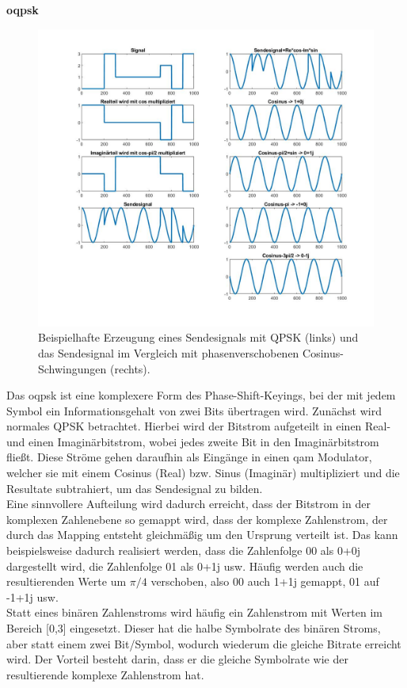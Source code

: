 \textbf{\ac{oqpsk}}\\
\begin{figure}
	\centering
	\includegraphics[width=\textwidth]{Grafiken-Alex/qpsk.jpg}
	\caption{Beispielhafte Erzeugung eines Sendesignals mit QPSK (links) und das Sendesignal im Vergleich mit phasenverschobenen Cosinus-Schwingungen (rechts).}
	\label{qpsk}
\end{figure}
Das \acf{oqpsk} ist eine komplexere Form des Phase-Shift-Keyings, bei der mit jedem Symbol ein Informationsgehalt von zwei Bits übertragen wird. Zunächst wird normales QPSK betrachtet. Hierbei wird der Bitstrom aufgeteilt in einen Real- und einen Imaginärbitstrom, wobei jedes zweite Bit in den Imaginärbitstrom fließt. Diese Ströme gehen daraufhin als Eingänge in einen \ac{qam} Modulator, welcher sie mit einem Cosinus (Real) bzw. Sinus (Imaginär) multipliziert und die Resultate subtrahiert, um das Sendesignal zu bilden.\\
Eine sinnvollere Aufteilung wird dadurch erreicht, dass der Bitstrom in der komplexen Zahlenebene so gemappt wird, dass der komplexe Zahlenstrom, der durch das Mapping entsteht gleichmäßig um den Ursprung verteilt ist. Das kann beispielsweise dadurch realisiert werden, dass die Zahlenfolge 00 als 0+0j dargestellt wird, die Zahlenfolge 01 als 0+1j usw. Häufig werden auch die resultierenden Werte um $\pi/4$ verschoben, also 00 auch 1+1j gemappt, 01 auf -1+1j usw.\\
Statt eines binären Zahlenstroms wird häufig ein Zahlenstrom mit Werten im Bereich [0,3] eingesetzt. Dieser hat die halbe Symbolrate des binären Stroms, aber statt einem zwei Bit/Symbol, wodurch wiederum die gleiche Bitrate erreicht wird. Der Vorteil besteht darin, dass er die gleiche Symbolrate wie der resultierende komplexe Zahlenstrom hat.\\
